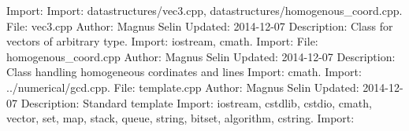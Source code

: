 \documentclass[a4paper]{article}
\begin{document}
\begin{multicols}{2}
Import: \newline 
Import: datastructures/vec3.cpp, datastructures/homogenous\_coord.cpp.\newline 
File: vec3.cpp\newline 
Author: Magnus Selin\newline 
Updated: 2014-12-07\newline 
Description: Class for vectors of arbitrary type.\newline 
Import: iostream, cmath.\newline 
Import: \newline 
File: homogenous\_coord.cpp\newline 
Author: Magnus Selin\newline 
Updated: 2014-12-07\newline 
Description: Class handling homogeneous cordinates and lines\newline 
Import: cmath.\newline 
Import: ../numerical/gcd.cpp.\newline 
File: template.cpp\newline 
Author: Magnus Selin\newline 
Updated: 2014-12-07\newline 
Description: Standard template\newline 
Import: iostream, cstdlib, cstdio, cmath, vector, set, map, stack, queue, string, bitset, algorithm, cstring.\newline 
Import: \newline 


\end{multicols}
\end{document}
